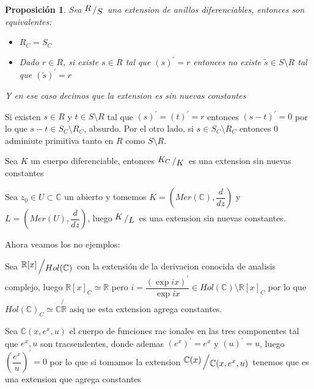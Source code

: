 \documentclass[11pt]{article}
\newcommand{\C}{\mathbb{C}}
\newcommand{\R}{{\mathbb{R}}}
\newcommand{\quotient}[2]{{\raisebox{.2em}{$#1$}\left/\raisebox{-.2em}{$#2$}\right.}}
\newcommand{\derivation}[1]{\left(#1\right)^\prime}
\newcommand{\constants}[1]{#1_C}
\numberwithin{theorem}{subsection}
\newtheorem{proposition}[theorem]{Proposici\'on}
\newenvironment{proof}[1][Demostraci\'on]{\begin{trivlist}
		\item[\hskip \labelsep {\bfseries #1}]}{\end{trivlist}}
\newenvironment{example}[1][Ejemplo]{\begin{trivlist}
		\item[\hskip \labelsep {\bfseries #1 }]}{\end{trivlist}}
\newcommand{\qed}{\nobreak \ifvmode \relax \else
	\ifdim\lastskip<1.5em \hskip-\lastskip
	\hskip1.5em plus0em minus0.5em \fi \nobreak
	\vrule height0.75em width0.5em depth0.25em\fi}
\begin{document}
\begin{proposition}
	Sea $\quotient{R}{S}$ una extension de anillos diferenciables, entonces son equivalentes:
	
	\begin{itemize}
		\item $\constants{R} = \constants{S}$
		\item Dado $r \in R$, si existe $s \in R$ tal que $\derivation{s} =r$ entonces no existe $\tilde{s} \in S \setminus R$ tal que $\derivation{\tilde{s}} = r$
	\end{itemize}
	
	Y en ese caso decimos que la extension es sin nuevas constantes
	
\end{proposition}

\begin{proof}
	Si existen $s \in R$ y $t \in S \setminus R$ tal que $\derivation{s} = \derivation{t} = r$ entonces $\derivation{s-t} = 0$ por lo que $s-t \in \constants{S} \setminus \constants{R}$, absurdo.
	Por el otro lado, si $s \in \constants{S} \setminus \constants{R}$ entonces $0$ adminiute primitiva tanto en $R$ como $S \setminus R$. \qed
\end{proof}

\begin{example}
	Sea $K$ un cuerpo diferenciable, entonces $\quotient{\constants{K}}{K}$ es una extension sin nuevas constantes
\end{example}

\begin{example}
	Sea $z_0 \in U \subset \C$ un abierto y tomemos $K = \left(Mer(\C), \dfrac{d}{dz}\right)$ y $L = \left(Mer(U), \dfrac{d}{dz}\right)$, luego $\quotient{K}{L}$ es una extension sin nuevas constantes.
\end{example}

Ahora veamos los no ejemplos:

\begin{example}
	Sea $\quotient{\R[x]}{Hol(\C)}$ con la extensi\'on de la derivacion conocida de analisis complejo, luego $\constants{\R[x]} \simeq \R$ pero $i = \dfrac{\derivation{\exp ix}}{\exp ix} \in \constants{Hol(\C) \setminus \R[x]}$ por lo que $\constants{Hol(\C)} \simeq \C \not \R$ asiq ue esta extension agrega constantes.
\end{example}

\begin{example}
	Sea $\C(x, e^x, u)$ el cuerpo de funciones rac ionales en las tres componentes tal que $e^x, u$ son tracsendentes, donde ademas $\derivation{e^x} = e^x$ y $\derivation{u} =u$, luego $\derivation{\dfrac{e^x}{u}} =0$ por lo que si tomamos la extension $\quotient{\C(x)}{\C(x, e^x, u)}$ tenemos que es una extension que agrega constantes
\end{example}
\end{document}

